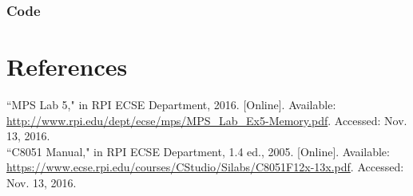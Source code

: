 \documentclass[12pt]{article}
\begin{document}
\subsubsection{Code}
	

\section{References} 
\noindent
``MPS Lab 5," in RPI ECSE Department, 2016. [Online]. Available: \url{http://www.rpi.edu/dept/ecse/mps/MPS_Lab_Ex5-Memory.pdf}. Accessed: Nov. 13, 2016.\\
\newline\noindent
``C8051 Manual," in RPI ECSE Department, 1.4 ed., 2005. [Online]. Available: \url{https://www.ecse.rpi.edu/courses/CStudio/Silabs/C8051F12x-13x.pdf}. Accessed: Nov. 13, 2016.
\end{document}

